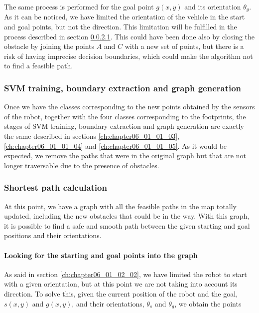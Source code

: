 The same process is performed for the goal point $g(x,y)$ and its orientation $\theta_g$. As it can be noticed, we have limited the orientation of the vehicle in the start and goal points, but not the direction. This limitation will be fulfilled in the process described in section \ref{ch:chapter06_01_02_04_01}. This could have been done also by closing the obstacle by joining the points $A$ and $C$ with a new set of points, but there is a risk of having imprecise decision boundaries, which could make the algorithm not to find a feasible path.

\subsubsection{\ac{SVM} training, boundary extraction and graph generation}\label{ch:chapter06_01_02_03}

Once we have the classes corresponding to the new points obtained by the sensors of the robot, together with the four classes corresponding to the footprints, the stages of \ac{SVM} training, boundary extraction and graph generation are exactly the same described in sections \ref{ch:chapter06_01_01_03}, \ref{ch:chapter06_01_01_04} and \ref{ch:chapter06_01_01_05}. As it would be expected, we remove the paths that were in the original graph but that are not longer traversable due to the presence of obstacles.

\subsubsection{Shortest path calculation}\label{ch:chapter06_01_02_04}

At this point, we have a graph with all the feasible paths in the map totally updated, including the new obstacles that could be in the way. With this graph, it is possible to find a safe and smooth path between the given starting and goal positions and their orientations.

\paragraph{Looking for the starting and goal points into the graph}\label{ch:chapter06_01_02_04_01}

As said in section \ref{ch:chapter06_01_02_02}, we have limited the robot to start with a given orientation, but at this point we are not taking into account its direction. To solve this, given the current position of the robot and the goal, $s(x,y)$ and $g(x,y)$, and their orientations, $\theta_s$ and $\theta_g$, we obtain the points

